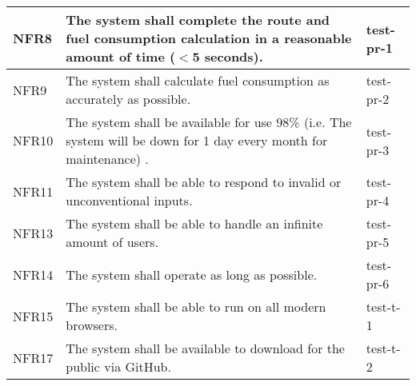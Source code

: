 \documentclass[12pt, titlepage]{article}
\begin{document}
\begin{table}[!hbp]
\begin{tabular}{|p{3.5cm}|p{6.5cm}|p{4.5cm}|}
	NFR8                     & The system shall complete the route and fuel consumption calculation in a reasonable amount of time ($<$5 seconds).                                                                                                                                & test-pr-1                                                                                          \\ \hline
	NFR9                    & The system shall calculate fuel consumption as accurately as possible.                                                                                                                                & test-pr-2                                                                                          \\ \hline
	NFR10                     & The system shall be available for use 98\% (i.e. The system will be down for 1 day every month for maintenance) .                                                                                                                                & test-pr-3                                                                                          \\ \hline
	NFR11                     & The system shall be able to respond to invalid or unconventional inputs.                                                                                                                                & test-pr-4                                                                                          \\ \hline
	NFR13                     & The system shall be able to handle an infinite amount of users.                                                                                                                                & test-pr-5                                                                                          \\ \hline
	NFR14                     & The system shall operate as long as possible.                                                                                                                                & test-pr-6                                                                                          \\ \hline
	NFR15                     & The system shall be able to run on all modern browsers.                                                                                                        & test-t-1                                                                                          \\ \hline
	NFR17                    & The system shall be available to download for the public via GitHub.                                                                                                        & test-t-2                                                                                          \\ \hline
	\end{tabular}
	
  \end{table}
  
\end{document}
